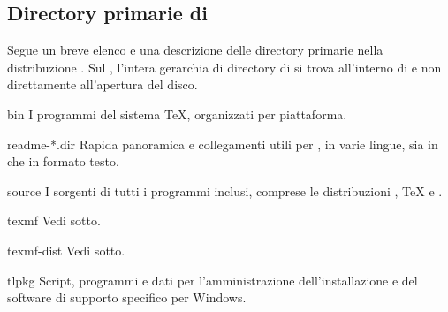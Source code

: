 \documentclass{article}
\begin{document}
\subsection{Directory primarie di \TL{}}
\label{sec:tld}

Segue un breve elenco e una descrizione delle directory primarie nella
distribuzione \TL. Sul \DVD{} \TK, l'intera gerarchia di directory di
\TL{} si trova all'interno di  e non direttamente
all'apertura del disco.

\begin{ttdescription}
\item[bin] I programmi del sistema \TeX{}, organizzati per piattaforma.
%
\item[readme-*.dir] Rapida panoramica e collegamenti utili per \TL{}, in
  varie lingue, sia in \HTML{} che in formato testo.
%
\item[source] I sorgenti di tutti i programmi inclusi, comprese le
  distribuzioni \Webc{}, \TeX{} e \MF{}.
%
\item[texmf] Vedi  sotto.
%
\item[texmf-dist] Vedi  sotto.
%
\item[tlpkg] Script, programmi e dati per l'amministrazione
  dell'installazione e del software di supporto specifico per Windows.
\end{ttdescription}
\end{document}

